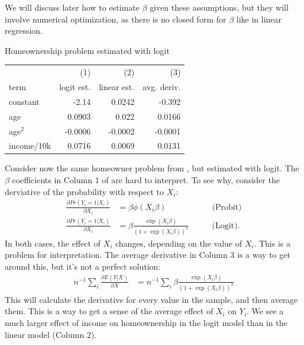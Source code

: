 \documentclass{tufte-handout}
\theoremstyle{break}
\newcommand{\continuation}{??}
\newenvironment{continueexample}[1]
 {\renewcommand{\continuation}{\ref{#1}}\excont[continued]}
 {\endexcont}
\begin{document}
We will discuss later how to estimate $\beta$ given these assumptions, but they will involve numerical optimization, as there is no closed form for $\beta$ like in linear regression.

\begin{margintable}
    \caption{Homeownership problem estimated with logit}
    \label{tab:logit_homeowner}
    \begin{tabular}{lrrr}
        & (1) & (2) & (3) \\
      term  &      logit est. & linear est. & avg. deriv. \\
      \midrule
      constant &      -2.14      &        0.0242 & -0.392 \\
      age      &         0.0903  &          0.022& 0.0166\\
      age$^{2}$ &          -0.0006&         -0.0002 & -0.0001\\
      income/10k     &       0.0716       &     0.0069 & 0.0131  
    \end{tabular}
\end{margintable}
\begin{boxD}
    \begin{continueexample}{example:homeownership}
        Consider now the same homeowner problem from , but estimated with logit.  The $\beta$ coefficients in Column 1 of  are hard to interpret. To see why, consider the derviative of the probability with respect to $X_{i}$: 
         \begin{align*}
            \frac{\partial Pr(Y_{i} = 1 | X_{i})}{\partial X_{i}} &= \beta\phi(X_{i}\beta) &\qquad \text{(Probit)}\\
            \frac{\partial Pr(Y_{i} = 1 | X_{i})}{\partial X_{i}} &= \beta \frac{\exp(X_{i}\beta)}{(1+\exp(X_{i}\beta))^{2}}  &\qquad \text{(Logit)}.
         \end{align*}
        In both cases, the effect of $X_{i}$ changes, depending on the value of $X_{i}$. This is a problem for interpretation.  The average derivative in Column 3 is a way to get around this, but it's not a perfect solution:
        \begin{align*}
        n^{-1}\sum_{i} \frac{\partial E(Y|X)}{\partial X} 
        &=n^{-1}\sum_{i} \beta \frac{\exp(X_{i}\beta)}{(1+\exp(X_{i}\beta))^{2}}
        \end{align*}
        This will calculate the derivative for every value in the sample, and then average them.  This is a way to get a sense of the average effect of $X_{i}$ on $Y_{i}$. We see a much larger effect of income on homeownership in the logit model than in the linear model (Column 2).
    \end{continueexample}
\end{boxD}
  
\end{document}
